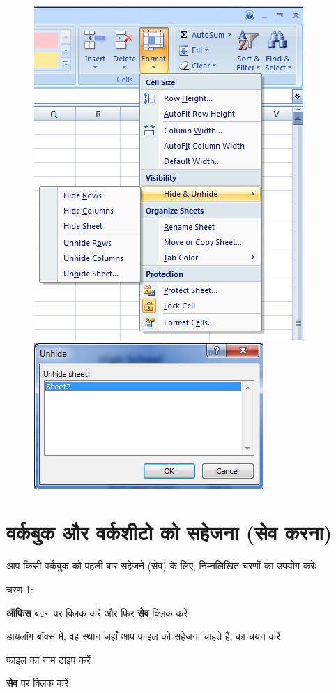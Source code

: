 \begin{figure}[t]
\centering
\includegraphics[scale=0.33]{src/images/chapter1/chapter1_fig22.png}\qquad
\includegraphics[scale=0.33]{src/images/chapter1/chapter1_fig23.png}
\end{figure}

\section{वर्कबुक और वर्कशीटो को सहेजना (सेव करना)}\label{id-1.13}

आप किसी वर्कबुक को पहली बार सहेजने (सेव) के लिए, निम्नलिखित चरणों का उपयोग करेः
\begin{descriptionSimple}{चरण 1:}
\item[चरण 1] \textbf{ऑफिस} बटन पर क्लिक करें और फिर \textbf{सेव} क्लिक करें
\item[चरण 2] डायलॉग बॉक्स में, वह स्थान जहाँ आप फाइल को सहेजना चाहते हैं, का चयन करें
\item[चरण 3] फाइल का नाम टाइप करें
\item[चरण 4] \textbf{सेव} पर क्लिक करें
\end{descriptionSimple}

